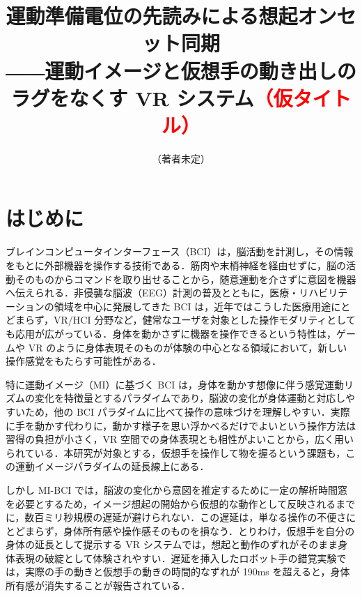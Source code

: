 \documentclass[twoside]{wiss}
\begin{document}
\title{運動準備電位の先読みによる想起オンセット同期\\
――運動イメージと仮想手の動き出しのラグをなくす VR システム\textcolor{red}{（仮タイトル）}}
\etitle{}

\author{（著者未定）}

\begin{abstract}
\end{abstract}

\maketitle

\section{はじめに}

ブレインコンピュータインターフェース（BCI）は，脳活動を計測し，その情報をもとに外部機器を操作する技術である．筋肉や末梢神経を経由せずに，脳の活動そのものからコマンドを取り出せることから，随意運動を介さずに意図を機器へ伝えられる．非侵襲な脳波（EEG）計測の普及とともに，医療・リハビリテーションの領域を中心に発展してきた BCI は，近年ではこうした医療用途にとどまらず，VR/HCI 分野など，健常なユーザを対象とした操作モダリティとしても応用が広がっている．身体を動かさずに機器を操作できるという特性は，ゲームや VR のように身体表現そのものが体験の中心となる領域において，新しい操作感覚をもたらす可能性がある．

特に運動イメージ（MI）に基づく BCI は，身体を動かす想像に伴う感覚運動リズムの変化を特徴量とするパラダイムであり，脳波の変化が身体運動と対応しやすいため，他の BCI パラダイムに比べて操作の意味づけを理解しやすい．実際に手を動かす代わりに，動かす様子を思い浮かべるだけでよいという操作方法は習得の負担が小さく，VR 空間での身体表現とも相性がよいことから，広く用いられている．本研究が対象とする，仮想手を操作して物を握るという課題も，この運動イメージパラダイムの延長線上にある．

しかし MI-BCI では，脳波の変化から意図を推定するために一定の解析時間窓を必要とするため，イメージ想起の開始から仮想的な動作として反映されるまでに，数百ミリ秒規模の遅延が避けられない．この遅延は，単なる操作の不便さにとどまらず，身体所有感や操作感そのものを損なう．とりわけ，仮想手を自分の身体の延長として提示する VR システムでは，想起と動作のずれがそのまま身体表現の破綻として体験されやすい．遅延を挿入したロボット手の錯覚実験では，実際の手の動きと仮想手の動きの時間的なずれが 190ms を超えると，身体所有感が消失することが報告されている\cite{ismail2016}．
\end{document}
